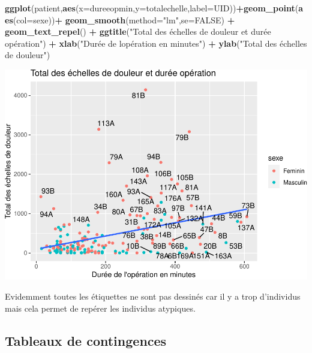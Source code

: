 \documentclass[
]{book}
\newenvironment{Shaded}{\begin{snugshade}}{\end{snugshade}}
\newcommand{\AttributeTok}[1]{\textcolor[rgb]{0.13,0.29,0.53}{#1}}
\newcommand{\ConstantTok}[1]{\textcolor[rgb]{0.56,0.35,0.01}{#1}}
\newcommand{\FunctionTok}[1]{\textcolor[rgb]{0.13,0.29,0.53}{\textbf{#1}}}
\newcommand{\NormalTok}[1]{#1}
\newcommand{\SpecialCharTok}[1]{\textcolor[rgb]{0.81,0.36,0.00}{\textbf{#1}}}
\newcommand{\StringTok}[1]{\textcolor[rgb]{0.31,0.60,0.02}{#1}}
\begin{document}
\begin{Shaded}
\begin{Highlighting}[]
\FunctionTok{ggplot}\NormalTok{(patient,}\FunctionTok{aes}\NormalTok{(}\AttributeTok{x=}\NormalTok{dureeopmin,}\AttributeTok{y=}\NormalTok{totalechelle,}\AttributeTok{label=}\NormalTok{UID))}\SpecialCharTok{+}\FunctionTok{geom\_point}\NormalTok{(}\FunctionTok{aes}\NormalTok{(}\AttributeTok{col=}\NormalTok{sexe))}\SpecialCharTok{+}
  \FunctionTok{geom\_smooth}\NormalTok{(}\AttributeTok{method=}\StringTok{"lm"}\NormalTok{,}\AttributeTok{se=}\ConstantTok{FALSE}\NormalTok{) }\SpecialCharTok{+}
  \FunctionTok{geom\_text\_repel}\NormalTok{() }\SpecialCharTok{+}
  \FunctionTok{ggtitle}\NormalTok{(}\StringTok{"Total des échelles de douleur et durée opération"}\NormalTok{) }\SpecialCharTok{+} 
  \FunctionTok{xlab}\NormalTok{(}\StringTok{"Durée de l\textquotesingle{}opération en minutes"}\NormalTok{) }\SpecialCharTok{+} 
  \FunctionTok{ylab}\NormalTok{(}\StringTok{"Total des échelles de douleur"}\NormalTok{) }
\end{Highlighting}
\end{Shaded}

\includegraphics{_main_files/figure-latex/ggplot21-1.pdf}

Evidemment toutes les étiquettes ne sont pas dessinés car il y a trop d'individus
mais cela permet de repérer les individus atypiques.

\subsection{Tableaux de contingences}\label{tableaux-de-contingences}
\end{document}
